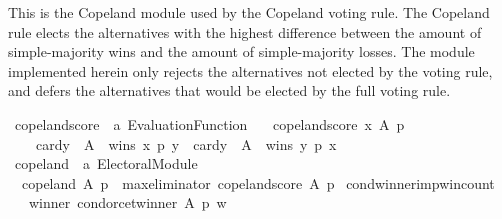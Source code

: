\begin{isabellebody}
%
\endisadelimdocument
%
\isatagdocument
%
\isamarkuptrue%
%
\endisatagdocument
{\isafolddocument}%
%
\isadelimdocument
%
\endisadelimdocument
%
\begin{isamarkuptext}%
This is the Copeland module used by the Copeland voting rule. The Copeland
rule elects the alternatives with the highest difference between the amount
of simple-majority wins and the amount of simple-majority losses. The module
implemented herein only rejects the alternatives not elected by the voting
rule, and defers the alternatives that would be elected by the full voting
rule.%
\end{isamarkuptext}\isamarkuptrue%
%
\isadelimdocument
%
\endisadelimdocument
%
\isatagdocument
%
\isamarkuptrue%
%
\endisatagdocument
{\isafolddocument}%
%
\isadelimdocument
%
\endisadelimdocument
{}\isamarkupfalse%
\ copeland{\isacharunderscore}{\kern0pt}score\ {\isacharcolon}{\kern0pt}{\isacharcolon}{\kern0pt}\ {\isachardoublequoteopen}{\isacharprime}{\kern0pt}a\ Evaluation{\isacharunderscore}{\kern0pt}Function{\isachardoublequoteclose}\ \isanewline
\ \ {\isachardoublequoteopen}copeland{\isacharunderscore}{\kern0pt}score\ x\ A\ p\ {\isacharequal}{\kern0pt}\isanewline
\ \ \ \ card{\isacharbraceleft}{\kern0pt}y\ {\isasymin}\ A\ {\isachardot}{\kern0pt}\ wins\ x\ p\ y{\isacharbraceright}{\kern0pt}\ {\isacharminus}{\kern0pt}\ card{\isacharbraceleft}{\kern0pt}y\ {\isasymin}\ A\ {\isachardot}{\kern0pt}\ wins\ y\ p\ x{\isacharbraceright}{\kern0pt}{\isachardoublequoteclose}\isanewline
\isanewline
{}\isamarkupfalse%
\ copeland\ {\isacharcolon}{\kern0pt}{\isacharcolon}{\kern0pt}\ {\isachardoublequoteopen}{\isacharprime}{\kern0pt}a\ Electoral{\isacharunderscore}{\kern0pt}Module{\isachardoublequoteclose}\ \isanewline
\ \ {\isachardoublequoteopen}copeland\ A\ p\ {\isacharequal}{\kern0pt}\ max{\isacharunderscore}{\kern0pt}eliminator\ copeland{\isacharunderscore}{\kern0pt}score\ A\ p{\isachardoublequoteclose}%
\isadelimdocument
%
\endisadelimdocument
%
\isatagdocument
%
\isamarkuptrue%
%
\endisatagdocument
{\isafolddocument}%
%
\isadelimdocument
%
\endisadelimdocument
{}\isamarkupfalse%
\ cond{\isacharunderscore}{\kern0pt}winner{\isacharunderscore}{\kern0pt}imp{\isacharunderscore}{\kern0pt}win{\isacharunderscore}{\kern0pt}count{\isacharcolon}{\kern0pt}\isanewline
\ \ \ winner{\isacharcolon}{\kern0pt}\ {\isachardoublequoteopen}condorcet{\isacharunderscore}{\kern0pt}winner\ A\ p\ w{\isachardoublequoteclose}\isanewline

\end{isabellebody}
